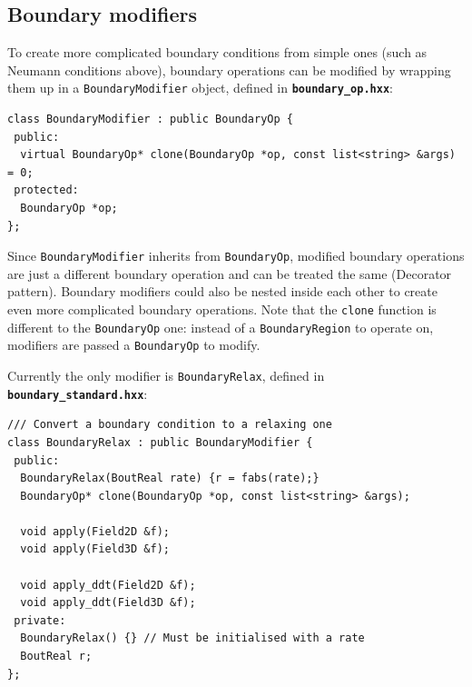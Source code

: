 \documentclass[12pt]{article}
\newcommand{\code}[1]{\texttt{#1}}
\newcommand{\file}[1]{\texttt{\bf #1}}
\begin{document}
\subsection{Boundary modifiers}
%
To create more complicated boundary conditions from simple ones (such as
Neumann conditions above), boundary operations can be modified by wrapping them
up in a \code{BoundaryModifier} object, defined in \file{boundary\_op.hxx}:
%
%
\begin{lstlisting}[firstnumber=63]
class BoundaryModifier : public BoundaryOp {
 public:
  virtual BoundaryOp* clone(BoundaryOp *op, const list<string> &args) = 0;
 protected:
  BoundaryOp *op;
};
\end{lstlisting}
%
Since \code{BoundaryModifier} inherits from \code{BoundaryOp}, modified
boundary operations are just a different boundary operation and can be treated
the same (Decorator pattern). Boundary modifiers could also be nested inside
each other to create even more complicated boundary operations.  Note that the
\code{clone} function is different to the \code{BoundaryOp} one: instead of a
\code{BoundaryRegion} to operate on, modifiers are passed a \code{BoundaryOp}
to modify.

Currently the only modifier is \code{BoundaryRelax}, defined in
\file{boundary\_standard.hxx}:
%
%
\begin{lstlisting}[firstnumber=64]
/// Convert a boundary condition to a relaxing one
class BoundaryRelax : public BoundaryModifier {
 public:
  BoundaryRelax(BoutReal rate) {r = fabs(rate);}
  BoundaryOp* clone(BoundaryOp *op, const list<string> &args);

  void apply(Field2D &f);
  void apply(Field3D &f);

  void apply_ddt(Field2D &f);
  void apply_ddt(Field3D &f);
 private:
  BoundaryRelax() {} // Must be initialised with a rate
  BoutReal r;
};
\end{lstlisting}
%
\end{document}
